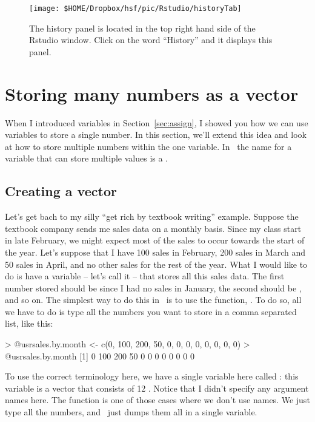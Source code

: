 \begin{figure}[t]
\begin{center}
		\texttt{[image: \$HOME/Dropbox/hsf/pic/Rstudio/historyTab]}
\caption{The history panel is located in the top right hand side of the Rstudio window. Click on the word ``History'' and it displays this panel.  }
\label{fig:Rstudiohistory}
\end{center}
\end{figure}



\section{Storing many numbers as a vector~\label{sec:vectors}}

When I introduced variables in Section~\ref{sec:assign}, I showed you how we can use variables to store a single number. In this section, we'll extend this idea and look at how to store multiple numbers within the one variable. In \R\, the name for a variable that can store multiple values is a . 

\subsection{Creating a vector}

Let's get bach to my silly ``get rich by textbook writing'' example. Suppose the textbook company sends me sales data on a monthly basis. Since my class start in late February, we might expect most of the sales to occur towards the start of the year. Let's suppose that I have 100 sales in February, 200 sales in March and 50 sales in April, and no other sales for the rest of the year. What I would like to do is have a variable -- let's call it  -- that stores all this sales data. The first number stored should be  since I had no sales in January, the second should be , and so on. The simplest way to do this in \R\ is to use the  function, . To do so, all we have to do is type all the numbers you want to store in a comma separated list, like this:
\begin{rblock1}
> @usr{sales.by.month <- c(0, 100, 200, 50, 0, 0, 0, 0, 0, 0, 0, 0)}
> @usr{sales.by.month}
 [1]   0 100 200  50   0   0   0   0   0   0   0   0
\end{rblock1}
To use the correct terminology here, we have a single variable here called : this variable is a vector that consists of 12 . 
Notice that I didn't specify any argument names here. The  function is one of those cases where we don't use names. We just type all the numbers, and \R\ just dumps them all in a single variable.





